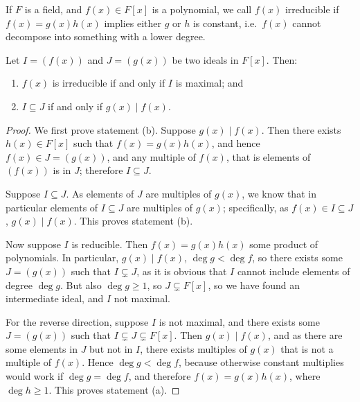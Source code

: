 \begin{definition}
    If \(F\) is a field, and \(f(x) \in F[x]\) is a polynomial,
    we call \(f(x)\) irreducible
    if \(f(x) = g(x)h(x)\) implies either \(g\) or \(h\) is constant,
    i.e.\ \(f(x)\) cannot decompose into something with a lower degree.
\end{definition}
\begin{theorem}\label{thm:ideal-divisibility}
    Let \(I = (f(x))\) and \(J = (g(x))\) be two ideals in \(F[x]\).
    Then:
    \begin{enumerate}[label={(\alph*)}, itemsep=0mm]
        \item \(f(x)\) is irreducible if and only if \(I\) is maximal; and
        \item \(I \subseteq J\) if and only if \(g(x) \mid f(x)\).
    \end{enumerate}
\end{theorem}
\begin{proof}
    We first prove statement (b).
    Suppose \(g(x) \mid f(x)\).
    Then there exists \(h(x) \in F[x]\) such that \(f(x) = g(x)h(x)\),
    and hence \(f(x) \in J = (g(x))\),
    and any multiple of \(f(x)\), that is elements of \((f(x))\) is in \(J\);
    therefore \(I \subseteq J\).

    Suppose \(I \subseteq J\).
    As elements of \(J\) are multiples of \(g(x)\),
    we know that in particular elements of \(I \subseteq J\)
    are multiples of \(g(x)\);
    specifically, as \(f(x) \in I \subseteq J\),
    \(g(x) \mid f(x)\).
    This proves statement (b).

    \medskip

    Now suppose \(I\) is reducible.
    Then \(f(x) = g(x)h(x)\) some product of polynomials.
    In particular, \(g(x) \mid f(x)\), \(\deg g < \deg f\),
    so there exists some \(J = (g(x))\) such that \(I \subsetneq J\),
    as it is obvious that \(I\) cannot include elements of degree \(\deg g\).
    But also \(\deg g \geq 1\), so \(J \subsetneq F[x]\),
    so we have found an intermediate ideal,
    and \(I\) not maximal.

    For the reverse direction,
    suppose \(I\) is not maximal,
    and there exists some \(J = (g(x))\)
    such that \(I \subsetneq J \subsetneq F[x]\).
    Then \(g(x) \mid f(x)\),
    and as there are some elements in \(J\) but not in \(I\),
    there exists multiples of \(g(x)\) that is not a multiple of \(f(x)\).
    Hence \(\deg g < \deg f\),
    because otherwise constant multiplies would work if \(\deg g = \deg f\),
    and therefore \(f(x) = g(x)h(x)\),
    where \(\deg h \geq 1\).
    This proves statement (a).
\end{proof}

